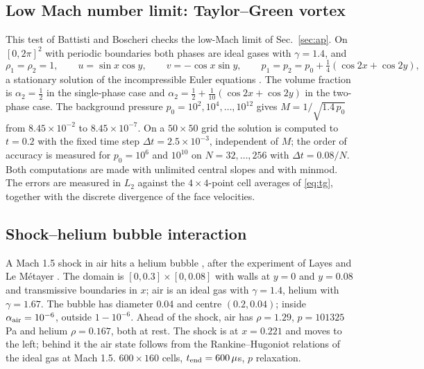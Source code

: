 \subsection{Low Mach number limit: Taylor--Green vortex}
\label{sec:res_tg}
This test of Battisti and Boscheri \cite[Sec.~4.4]{BattistiBoscheri2025} checks the low-Mach limit of Sec.~\ref{sec:ap}. On $[0,2\pi]^2$ with periodic
boundaries both phases are ideal gases with $\gamma=1.4$, and
\begin{equation}
\rho_1=\rho_2=1,\qquad u=\sin x\cos y,\qquad v=-\cos x\sin y,\qquad p_1=p_2=p_0+\tfrac14(\cos2x+\cos2y),
\label{eq:tg}
\end{equation}
a stationary solution of the incompressible Euler equations \cite{TaylorGreen1937}. The volume fraction is $\alpha_2=\tfrac12$ in the single-phase
case and $\alpha_2=\tfrac12+\tfrac1{10}(\cos2x+\cos2y)$ in the two-phase case. The background pressure
$p_0=10^2,10^4,\dots,10^{12}$ gives $M=1/\sqrt{1.4\,p_0}$ from $8.45\times10^{-2}$ to $8.45\times10^{-7}$. On a $50\times50$ grid the
solution is computed to $t=0.2$ with the fixed time step $\Delta t=2.5\times10^{-3}$, independent of $M$; the order of
accuracy is measured for $p_0=10^6$ and $10^{10}$ on $N=32,\dots,256$ with $\Delta t=0.08/N$. Both computations are made with
unlimited central slopes and with minmod. The errors are measured in $L_2$ against the $4\times4$-point cell averages of
\eqref{eq:tg}, together with the discrete divergence of the face velocities.
\subsection{Shock--helium bubble interaction}
\label{sec:res_he}
A Mach 1.5 shock in air hits a helium bubble \cite[Sec.~4.6]{SPB2009}, after the experiment of Layes and Le M\'etayer \cite{LayesLeMetayer2007}. The domain is $[0,0.3]\times[0,0.08]$ with
walls at $y=0$ and $y=0.08$ and transmissive boundaries in $x$; air is an ideal gas with $\gamma=1.4$, helium with
$\gamma=1.67$. The bubble has diameter 0.04 and centre $(0.2,0.04)$; inside $\alpha_{\rm air}=10^{-6}$, outside $1-10^{-6}$. Ahead
of the shock, air has $\rho=1.29$, $p=101325$\,Pa and helium $\rho=0.167$, both at rest. The shock is at $x=0.221$ and
moves to the left; behind it the air state follows from the Rankine--Hugoniot relations of the ideal gas at Mach 1.5.
$600\times160$ cells, $t_{\rm end}=600\,\mu$s, $p$ relaxation.

